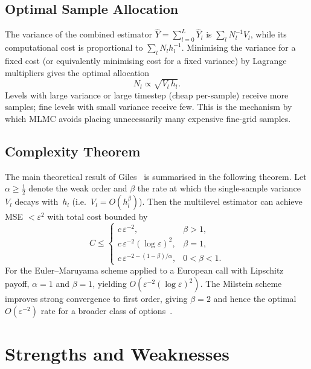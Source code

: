 \documentclass[11pt]{article}
\begin{document}
\subsection{Optimal Sample Allocation}

The variance of the combined estimator $\hat{Y} = \sum_{l=0}^{L}\hat{Y}_{l}$ is $\sum_{l}N_{l}^{-1}V_{l}$, while its computational cost is proportional to $\sum_{l}N_{l}h_{l}^{-1}$. Minimising the variance for a fixed cost (or equivalently minimising cost for a fixed variance) by Lagrange multipliers gives the optimal allocation
\begin{equation}
N_{l} \propto \sqrt{V_{l}\,h_{l}}.
\label{eq:opt_alloc}
\end{equation}
Levels with large variance or large timestep (cheap per-sample) receive more samples; fine levels with small variance receive few. This is the mechanism by which MLMC avoids placing unnecessarily many expensive fine-grid samples.

\subsection{Complexity Theorem}

The main theoretical result of Giles~\cite{giles2008} is summarised in the following theorem. Let $\alpha \ge \tfrac{1}{2}$ denote the weak order and $\beta$ the rate at which the single-sample variance $V_{l}$ decays with~$h_{l}$ (i.e.\ $V_{l} = O(h_{l}^{\beta})$). Then the multilevel estimator can achieve MSE $< \varepsilon^{2}$ with total cost bounded by
\begin{equation}
C \le
\begin{cases}
c\,\varepsilon^{-2}, & \beta > 1,\\[4pt]
c\,\varepsilon^{-2}(\log\varepsilon)^{2}, & \beta = 1,\\[4pt]
c\,\varepsilon^{-2-(1-\beta)/\alpha}, & 0 < \beta < 1.
\end{cases}
\label{eq:complexity}
\end{equation}
For the Euler--Maruyama scheme applied to a European call with Lipschitz payoff, $\alpha = 1$ and $\beta = 1$, yielding $O(\varepsilon^{-2}(\log\varepsilon)^{2})$. The Milstein scheme improves strong convergence to first order, giving $\beta = 2$ and hence the optimal $O(\varepsilon^{-2})$ rate for a broader class of options~\cite{giles2008b}.

\section{Strengths and Weaknesses}\label{sec:strengths_weaknesses}
\end{document}
